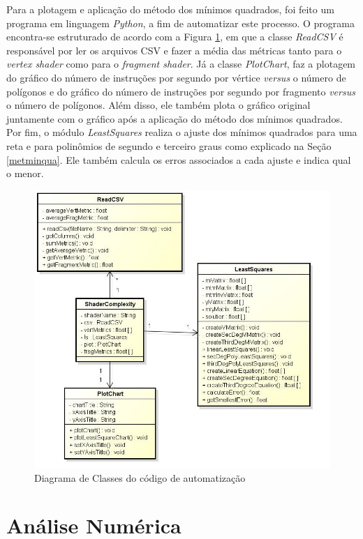	Para a plotagem e aplicação do método dos mínimos quadrados, foi feito um programa em linguagem \textit{Python}, a fim de automatizar este processo. O programa encontra-se estruturado de acordo com a Figura \ref{minquad_diag}, em que a classe \textit{ReadCSV} é responsável por ler os arquivos CSV e fazer a média das métricas tanto para o \textit{vertex shader} como para o \textit{fragment shader}. Já a classe \textit{PlotChart}, faz a plotagem do gráfico do número de instruções por segundo por vértice \textit{versus} o número de polígonos e do gráfico do número de instruções por segundo por fragmento \textit{versus} o número de polígonos. Além disso, ele também plota o gráfico original juntamente com o gráfico após a aplicação do método dos mínimos quadrados. Por fim, o módulo \textit{LeastSquares} realiza o ajuste dos mínimos quadrados para uma reta e para polinômios de segundo e terceiro graus como explicado na Seção \ref{metminqua}. Ele também calcula os erros associados a cada ajuste e indica qual o menor. 

	\begin{figure}[h]
	\centering
		\includegraphics[keepaspectratio=true,scale=0.6]{figuras/minquad_diag.jpg}
	\caption{Diagrama de Classes do código de automatização}
	\label{minquad_diag}
	\end{figure}


\section{Análise Numérica}


